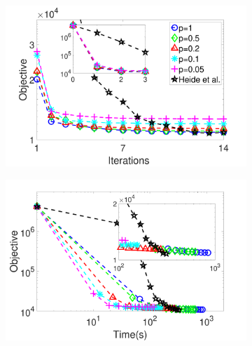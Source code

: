 \documentclass[10pt,twocolumn,letterpaper]{article}
\begin{document}
\begin{figure}[h]
\begin{subfigure}{0.5\textwidth}
  \includegraphics[width=1\linewidth]{figure/iteVSobj-city.pdf}
\end{subfigure}
\begin{subfigure}{0.5\textwidth}
  \includegraphics[width=1\linewidth]{figure/timeVSobj-city.pdf}
\end{subfigure}


\end{figure}
\end{document}
